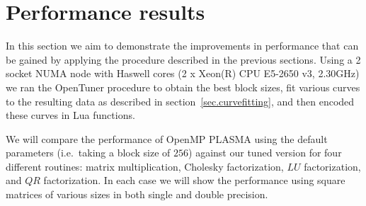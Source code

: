 \documentclass[a4paper,12pt]{article}
\begin{document}
\section{Performance results}
\label{sec.performance}
In this section we aim to demonstrate the
improvements in performance that can be gained
by applying the procedure described in the
previous sections.
Using a 2 socket NUMA node with
Haswell cores (2 x Xeon(R) CPU E5-2650 v3, 2.30GHz)
we ran the OpenTuner procedure to obtain the
best block sizes,
fit various curves to the resulting data
as described in section~\ref{sec.curvefitting},
and then encoded these curves in Lua functions.

We will compare the performance of OpenMP PLASMA
using the default parameters (i\@.e\@.~taking a block size of $256$)
against our tuned version for four different routines:
matrix multiplication, Cholesky factorization,
$LU$ factorization, and $QR$ factorization.
In each case we will show the performance using square matrices of
various sizes in both single and double precision.
\end{document}
